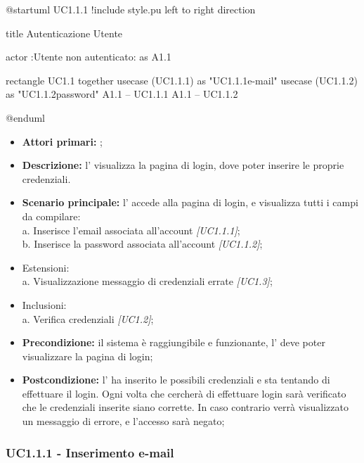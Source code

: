 \documentclass[casi-duso]{subfiles}
\begin{document}
\begin{plantuml}
@startuml UC1.1.1
!include style.pu
left to right direction

title Autenticazione Utente

actor :Utente non autenticato: as A1.1

rectangle UC1.1{
  together {
  usecase (UC1.1.1) as "UC1.1.1\nInserimento e-mail"
  usecase (UC1.1.2) as "UC1.1.2\nInserimento password"
  }
}
A1.1 -- UC1.1.1
A1.1 -- UC1.1.2

@enduml
\end{plantuml}


\begin{itemize}
  \item \textbf{Attori primari:} ;
  \item \textbf{Descrizione:} l' visualizza la pagina di login, dove poter inserire le proprie credenziali.
  \item \textbf{Scenario principale:} l' accede alla pagina di login, e visualizza tutti i campi da compilare:
        \\a. Inserisce l’email associata all’account \emph{[UC1.1.1]};
        \\b. Inserisce la password associata all’account \emph{[UC1.1.2]};
  \item Estensioni:
        \\a. Visualizzazione messaggio di credenziali errate \emph{[UC1.3]};
  \item Inclusioni:
        \\a. Verifica credenziali \emph{[UC1.2]};
  \item \textbf{Precondizione:} il sistema è raggiungibile e funzionante, l' deve poter visualizzare la pagina di login;
  \item \textbf{Postcondizione:} l' ha inserito le possibili credenziali e sta tentando di effettuare il login. Ogni volta che cercherà di effettuare
        login sarà verificato che le credenziali inserite siano corrette. In caso contrario verrà visualizzato un messaggio di errore, e l'accesso sarà negato;

\end{itemize}

\subsubsection{UC1.1.1 - Inserimento e-mail}
\label{subsub:UC1.1.1}
\end{document}
